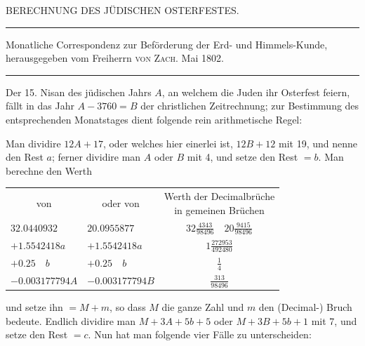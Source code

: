 \par\clearpage
\begingroup
\pagestyle{empty}
\newcommand{\GaussVIGathering}[2]{%
  \fancypagestyle{gaussVIGathering}{%
    \fancyhf{}%
    \renewcommand{\headrulewidth}{0pt}%
    \renewcommand{\footrulewidth}{0pt}%
    \fancyfoot[C]{\makebox[\textwidth][l]{%
      \hspace*{.025\textwidth}{\footnotesize\bfseries #1}\hfill
      {\normalsize\bfseries\textls[90]{#2}}\hspace*{.18\textwidth}}}%
  }%
  \thispagestyle{gaussVIGathering}%
}
\setlength{\abovedisplayskip}{7pt plus 2pt minus 2pt}
\setlength{\belowdisplayskip}{7pt plus 2pt minus 2pt}
\setlength{\abovedisplayshortskip}{4pt plus 2pt}
\setlength{\belowdisplayshortskip}{5pt plus 2pt minus 1pt}
\thispagestyle{empty}
%
\vspace*{.23\textheight}
\begin{center}
BERECHNUNG DES JÜDISCHEN OSTERFESTES.
\end{center}
\begin{center}
\parbox{.78\linewidth}{%
  \centering\fontsize{8}{10}\selectfont\frenchspacing
  \hrule height .3pt\relax\vspace{3pt}
  Monatliche Correspondenz zur Beförderung der Erd- und Himmels-Kunde,\\
  herausgegeben vom Freiherrn \textsc{von Zach}. Mai 1802.\par
  \vspace{3pt}\hrule height .3pt\relax
}
\end{center}
\par\indent Der 15. Nisan des jüdischen Jahrs $A$, an welchem die Juden ihr Osterfest
feiern, fällt in das Jahr $A-3760=B$ der christlichen Zeitrechnung; zur Bestimmung
des entsprechenden Monatstages dient folgende rein arithmetische
Regel:

Man dividire $12A+17$, oder welches hier einerlei ist, $12B+12$ mit 19,
und nenne den Rest $a$; ferner dividire man $A$ oder $B$ mit 4, und setze den
Rest $=b$. Man berechne den Werth
\begin{center}\small
\begin{tabular}{llc}
\multicolumn{1}{c}{von} & \multicolumn{1}{c}{oder von} & \shortstack{Werth der Decimalbrüche\\in gemeinen Brüchen}\\[5pt]
$32.0440932$ & $20.0955877$ & $32\frac{4343}{98496}\quad20\frac{9415}{98496}$\\[5pt]
$+1.5542418a$ & $+1.5542418a$ & $1\frac{272953}{492480}$\\[5pt]
$+0.25\quad b$ & $+0.25\quad b$ & $\frac14$\\[5pt]
$-0.003177794A$ & $-0.003177794B$ & $\frac{313}{98496}$
\end{tabular}
\end{center}
\noindent und setze ihn $=M+m$, so dass $M$ die ganze Zahl und $m$ den (Decimal-)
Bruch bedeute. Endlich dividire man $M+3A+5b+5$ oder $M+3B+5b+1$
mit 7, und setze den Rest $=c$. Nun hat man folgende vier Fälle zu unterscheiden:


